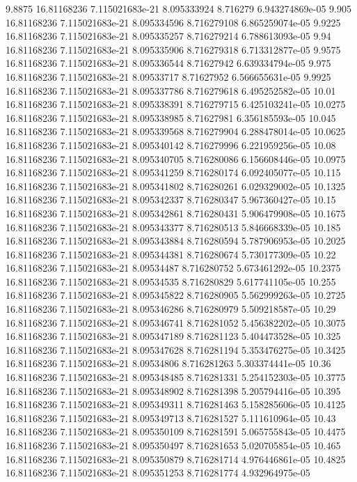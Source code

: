 {9.8875 16.81168236 7.115021683e-21 8.095333924 8.716279 6.943274869e-05
9.905 16.81168236 7.115021683e-21 8.095334596 8.716279108 6.865259074e-05
9.9225 16.81168236 7.115021683e-21 8.095335257 8.716279214 6.788613093e-05
9.94 16.81168236 7.115021683e-21 8.095335906 8.716279318 6.713312877e-05
9.9575 16.81168236 7.115021683e-21 8.095336544 8.71627942 6.639334794e-05
9.975 16.81168236 7.115021683e-21 8.09533717 8.71627952 6.566655631e-05
9.9925 16.81168236 7.115021683e-21 8.095337786 8.716279618 6.495252582e-05
10.01 16.81168236 7.115021683e-21 8.095338391 8.716279715 6.425103241e-05
10.0275 16.81168236 7.115021683e-21 8.095338985 8.71627981 6.356185593e-05
10.045 16.81168236 7.115021683e-21 8.095339568 8.716279904 6.288478014e-05
10.0625 16.81168236 7.115021683e-21 8.095340142 8.716279996 6.221959256e-05
10.08 16.81168236 7.115021683e-21 8.095340705 8.716280086 6.156608446e-05
10.0975 16.81168236 7.115021683e-21 8.095341259 8.716280174 6.092405077e-05
10.115 16.81168236 7.115021683e-21 8.095341802 8.716280261 6.029329002e-05
10.1325 16.81168236 7.115021683e-21 8.095342337 8.716280347 5.967360427e-05
10.15 16.81168236 7.115021683e-21 8.095342861 8.716280431 5.906479908e-05
10.1675 16.81168236 7.115021683e-21 8.095343377 8.716280513 5.846668339e-05
10.185 16.81168236 7.115021683e-21 8.095343884 8.716280594 5.787906953e-05
10.2025 16.81168236 7.115021683e-21 8.095344381 8.716280674 5.730177309e-05
10.22 16.81168236 7.115021683e-21 8.09534487 8.716280752 5.673461292e-05
10.2375 16.81168236 7.115021683e-21 8.09534535 8.716280829 5.617741105e-05
10.255 16.81168236 7.115021683e-21 8.095345822 8.716280905 5.562999263e-05
10.2725 16.81168236 7.115021683e-21 8.095346286 8.716280979 5.509218587e-05
10.29 16.81168236 7.115021683e-21 8.095346741 8.716281052 5.456382202e-05
10.3075 16.81168236 7.115021683e-21 8.095347189 8.716281123 5.404473528e-05
10.325 16.81168236 7.115021683e-21 8.095347628 8.716281194 5.353476275e-05
10.3425 16.81168236 7.115021683e-21 8.09534806 8.716281263 5.303374441e-05
10.36 16.81168236 7.115021683e-21 8.095348485 8.716281331 5.254152303e-05
10.3775 16.81168236 7.115021683e-21 8.095348902 8.716281398 5.205794416e-05
10.395 16.81168236 7.115021683e-21 8.095349311 8.716281463 5.158285606e-05
10.4125 16.81168236 7.115021683e-21 8.095349713 8.716281527 5.111610964e-05
10.43 16.81168236 7.115021683e-21 8.095350109 8.716281591 5.065755843e-05
10.4475 16.81168236 7.115021683e-21 8.095350497 8.716281653 5.020705854e-05
10.465 16.81168236 7.115021683e-21 8.095350879 8.716281714 4.976446861e-05
10.4825 16.81168236 7.115021683e-21 8.095351253 8.716281774 4.932964975e-05
}
